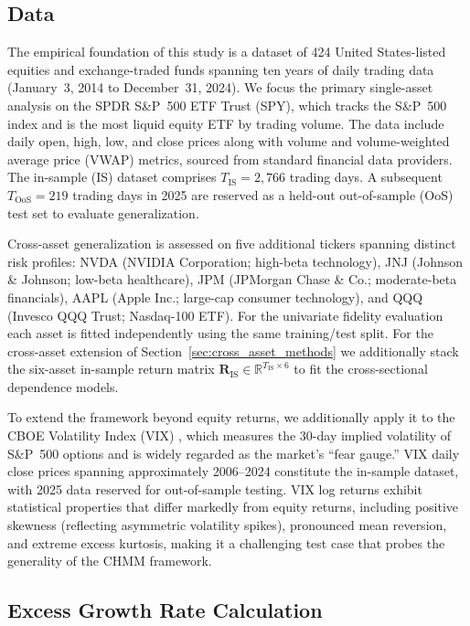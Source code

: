 \subsection{Data}
\label{sec:data}

The empirical foundation of this study is a dataset of 424 United States-listed equities and exchange-traded funds spanning ten years of daily trading data (January~3, 2014 to December~31, 2024).
We focus the primary single-asset analysis on the SPDR S\&P~500 ETF Trust (SPY), which tracks the S\&P~500 index and is the most liquid equity ETF by trading volume.
The data include daily open, high, low, and close prices along with volume and volume-weighted average price (VWAP) metrics, sourced from standard financial data providers.
The in-sample (IS) dataset comprises $T_{\text{IS}} = 2{,}766$ trading days.
A subsequent $T_{\text{OoS}} = 219$ trading days in 2025 are reserved as a held-out out-of-sample (OoS) test set to evaluate generalization.

Cross-asset generalization is assessed on five additional tickers spanning distinct risk profiles: NVDA (NVIDIA Corporation; high-beta technology), JNJ (Johnson \& Johnson; low-beta healthcare), JPM (JPMorgan Chase \& Co.; moderate-beta financials), AAPL (Apple Inc.; large-cap consumer technology), and QQQ (Invesco QQQ Trust; Nasdaq-100 ETF).
For the univariate fidelity evaluation each asset is fitted independently using the same training/test split.
For the cross-asset extension of Section~\ref{sec:cross_asset_methods} we additionally stack the six-asset in-sample return matrix $\mathbf{R}_{\text{IS}} \in \mathbb{R}^{T_{\text{IS}} \times 6}$ to fit the cross-sectional dependence models.

To extend the framework beyond equity returns, we additionally apply it to the CBOE Volatility Index (VIX) \cite{whaley2009vix}, which measures the 30-day implied volatility of S\&P~500 options and is widely regarded as the market's ``fear gauge.''
VIX daily close prices spanning approximately 2006--2024 constitute the in-sample dataset, with 2025 data reserved for out-of-sample testing.
VIX log returns exhibit statistical properties that differ markedly from equity returns, including positive skewness (reflecting asymmetric volatility spikes), pronounced mean reversion, and extreme excess kurtosis, making it a challenging test case that probes the generality of the CHMM framework.

\subsection{Excess Growth Rate Calculation}
\label{sec:growth_rate}

